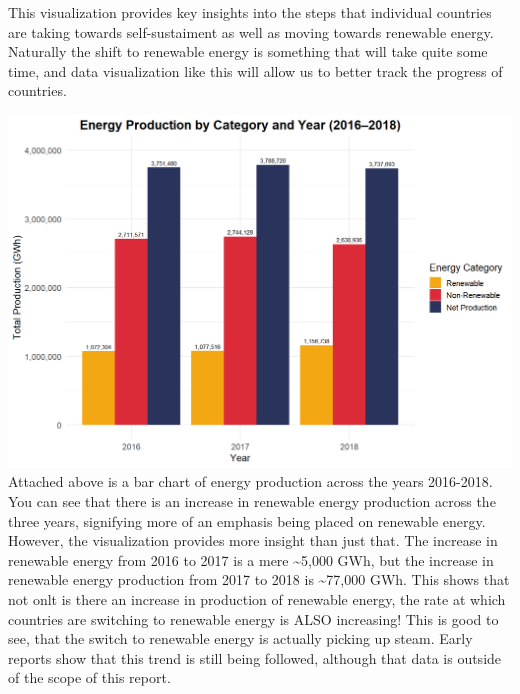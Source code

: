 \documentclass[
  letterpaper,
  DIV=11,
  numbers=noendperiod]{scrartcl}
\begin{document}
This visualization provides key insights into the steps that individual
countries are taking towards self-sustaiment as well as moving towards
renewable energy. Naturally the shift to renewable energy is something
that will take quite some time, and data visualization like this will
allow us to better track the progress of countries.

\includegraphics{../images/energy_category_years.png} Attached above is
a bar chart of energy production across the years 2016-2018. You can see
that there is an increase in renewable energy production across the
three years, signifying more of an emphasis being placed on renewable
energy. However, the visualization provides more insight than just that.
The increase in renewable energy from 2016 to 2017 is a mere
\textasciitilde5,000 GWh, but the increase in renewable energy
production from 2017 to 2018 is \textasciitilde77,000 GWh. This shows
that not onlt is there an increase in production of renewable energy,
the rate at which countries are switching to renewable energy is ALSO
increasing! This is good to see, that the switch to renewable energy is
actually picking up steam. Early reports show that this trend is still
being followed, although that data is outside of the scope of this
report.
\end{document}
